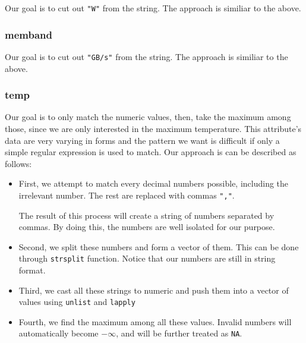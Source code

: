
Our goal is to cut out \verb|"W"| from the string. The approach is similiar to the above.

\subsubsection*{memband}


Our goal is to cut out \verb|"GB/s"| from the string. The approach is similiar to the above.

\subsubsection*{temp}


Our goal is to only match the numeric values, then, take the maximum among those, since we are only interested in the maximum temperature.
This attribute's data are very varying in forms and the pattern we want is difficult if only a simple regular expression is used to match.
Our approach is can be described as follows:

\begin{itemize}
    \item First, we attempt to match every decimal numbers possible, including the irrelevant number. The rest are replaced with commas \verb|","|.
    
    The result of this process will create a string of numbers separated by commas. By doing this, the numbers are well isolated for our purpose.

    \item Second, we split these numbers and form a vector of them. This can be done through \texttt{strsplit} function. Notice that our numbers
    are still in string format.

    \item Third, we cast all these strings to numeric and push them into a vector of values using \texttt{unlist} and \texttt{lapply}
    
    \item Fourth, we find the maximum among all these values. Invalid numbers will automatically become \(-\infty\), and will be further treated as \texttt{NA}.

\end{itemize}

